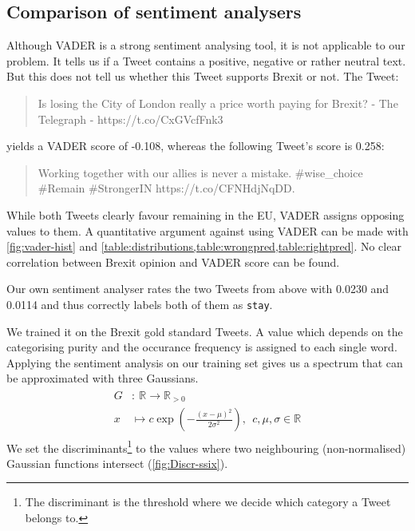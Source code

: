 \documentclass{emulateapj}
\begin{document}
\subsection{Comparison of sentiment analysers}
Although VADER is a strong sentiment analysing tool, it is not applicable to our problem. It tells us if a Tweet contains a positive, negative or rather neutral text. 
But this does not tell us whether this Tweet supports Brexit or not. 
The Tweet:
\begin{quote}
{\ttfamily
Is losing the City of London really a price worth paying for Brexit? - The Telegraph - https://t.co/CxGVcfFnk3
}
\end{quote}
yields a VADER score of -0.108, whereas the following Tweet's score is 0.258:
\begin{quote}
{\ttfamily
Working together with our allies is never a mistake. \#wise\_choice \#Remain \#StrongerIN https://t.co/CFNHdjNqDD.
}
\end{quote}

While both Tweets clearly favour remaining in the EU, VADER assigns opposing values to them. 
A quantitative argument against using VADER can be made with \cref{fig:vader-hist} and \cref{table:distributions,table:wrongpred,table:rightpred}. 
No clear correlation between Brexit opinion and VADER score can be found.

Our own sentiment analyser rates the two Tweets from above with 0.0230 and 0.0114 and thus correctly labels both of them as \texttt{stay}. 

We trained it on the Brexit gold standard Tweets. 
A value which depends on the categorising purity and the occurance frequency is assigned to each single word.
Applying the sentiment analysis on our training set gives us a spectrum that can be approximated with three Gaussians.
\begin{align}
  \begin{split}
  G&:~ \mathbb R \rightarrow \mathbb R_{>0} \\
  x& \mapsto c \exp\left(-\frac{(x - \mu)^2}{2\sigma^2}\right),~~ c, \mu, \sigma \in \mathbb R
  \end{split}
\end{align}
We set the discriminants\footnote{The discriminant is the threshold where we decide which category a Tweet belongs to.} to the values where two neighbouring (non-normalised) Gaussian functions intersect (\cref{fig:Discr-ssix}). 
\end{document}
